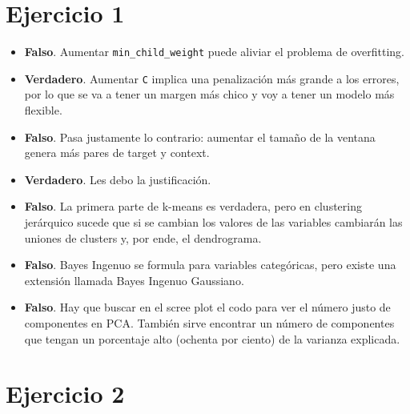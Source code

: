 \documentclass[12pt, a4paper]{article}
\begin{document}
  \section*{Ejercicio 1}
    \begin{itemize}
      \item \textbf{Falso}. Aumentar \texttt{min\_child\_weight} puede aliviar el problema de overfitting.
      \item \textbf{Verdadero}. Aumentar \texttt{C} implica una penalización más grande a los errores, por lo que se va a tener un margen más chico y voy a tener un modelo más flexible.
      \item \textbf{Falso}. Pasa justamente lo contrario: aumentar el tamaño de la ventana genera más pares de target y context.
      \item \textbf{Verdadero}. Les debo la justificación.
      \item \textbf{Falso}. La primera parte de k-means es verdadera, pero en clustering jerárquico sucede que si se cambian los valores de las variables cambiarán las uniones de clusters y, por ende, el dendrograma.
      \item \textbf{Falso}. Bayes Ingenuo se formula para variables categóricas, pero existe una extensión llamada Bayes Ingenuo Gaussiano.
      \item \textbf{Falso}. Hay que buscar en el scree plot el codo para ver el número justo de componentes en PCA. También sirve encontrar un número de componentes que tengan un porcentaje alto (ochenta por ciento) de la varianza explicada.
    \end{itemize}
  \section*{Ejercicio 2}
\end{document}
